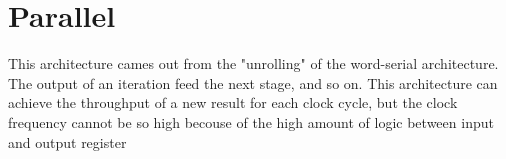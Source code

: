 \section{Parallel}\label{sec:parallel}
This architecture cames out from the "unrolling" of the word-serial
architecture. The output of an iteration feed the next stage, and so on.
This architecture can achieve the throughput of a new result for each clock 
cycle, but the clock frequency cannot be so high becouse of the high amount of 
logic between input and output register
